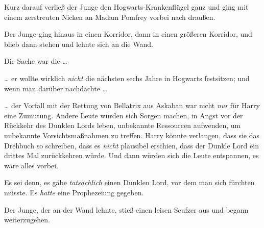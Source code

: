 Kurz darauf verließ der Junge den Hogwarts-Krankenflügel ganz und ging mit einem zerstreuten Nicken an Madam Pomfrey vorbei nach draußen.

Der Junge ging hinaus in einen Korridor, dann in einen größeren Korridor, und blieb dann stehen und lehnte sich an die Wand.

Die Sache war die …

… er wollte wirklich \emph{nicht} die nächsten sechs Jahre in Hogwarts festsitzen; und wenn man darüber nachdachte …

… der Vorfall mit der Rettung von Bellatrix aus Askaban war nicht \emph{nur} für Harry eine Zumutung. Andere Leute würden sich Sorgen machen, in Angst vor der Rückkehr des Dunklen Lords leben, unbekannte Ressourcen aufwenden, um unbekannte Vorsichtsmaßnahmen zu treffen. Harry könnte verlangen, dass sie das Drehbuch so schreiben, dass es \emph{nicht} plausibel erschien, dass der Dunkle Lord ein drittes Mal zurückkehren würde. Und dann würden sich die Leute entspannen, es wäre alles vorbei.

Es sei denn, es gäbe \emph{tatsächlich} einen Dunklen Lord, vor dem man sich fürchten müsste. Es \emph{hatte} eine Prophezeiung gegeben.

Der Junge, der an der Wand lehnte, stieß einen leisen Seufzer aus und begann weiterzugehen.

